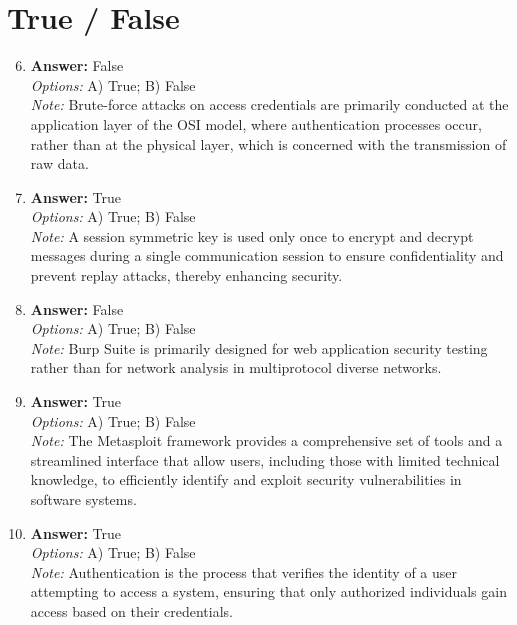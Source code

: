\documentclass[12pt]{article}
\begin{document}
\section*{True / False}
\begin{enumerate}[label=\arabic*.]
\setcounter{enumi}{5}
\item \textbf{Answer:} False
\\ \textit{Options:} A) True; B) False
\\ \textit{Note:} Brute-force attacks on access credentials are primarily conducted at the application layer of the OSI model, where authentication processes occur, rather than at the physical layer, which is concerned with the transmission of raw data.
\item \textbf{Answer:} True
\\ \textit{Options:} A) True; B) False
\\ \textit{Note:} A session symmetric key is used only once to encrypt and decrypt messages during a single communication session to ensure confidentiality and prevent replay attacks, thereby enhancing security.
\item \textbf{Answer:} False
\\ \textit{Options:} A) True; B) False
\\ \textit{Note:} Burp Suite is primarily designed for web application security testing rather than for network analysis in multiprotocol diverse networks.
\item \textbf{Answer:} True
\\ \textit{Options:} A) True; B) False
\\ \textit{Note:} The Metasploit framework provides a comprehensive set of tools and a streamlined interface that allow users, including those with limited technical knowledge, to efficiently identify and exploit security vulnerabilities in software systems.
\item \textbf{Answer:} True
\\ \textit{Options:} A) True; B) False
\\ \textit{Note:} Authentication is the process that verifies the identity of a user attempting to access a system, ensuring that only authorized individuals gain access based on their credentials.
\end{enumerate}
\end{document}
